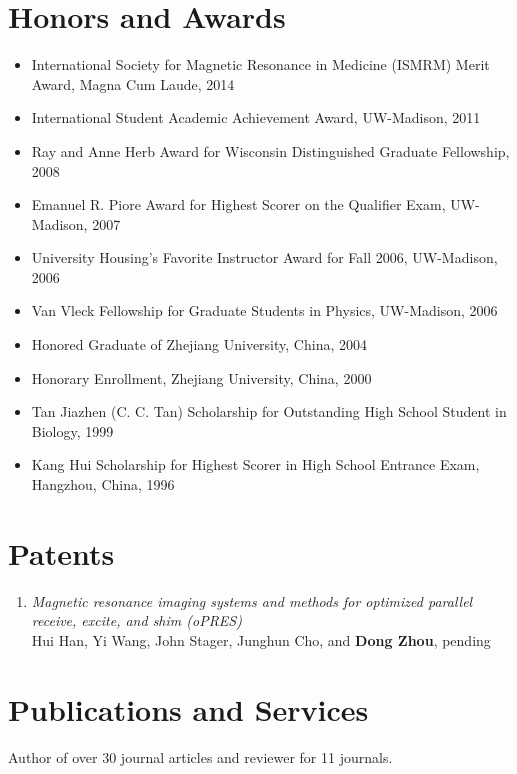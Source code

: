 \documentclass[centered,11pt,overlapped]{res}
\begin{document}
\begin{resume}
{\section{\sc Honors and Awards}
\begin{itemize}[leftmargin=-0.1in]
\item International Society for Magnetic Resonance in Medicine (ISMRM) Merit Award, Magna Cum Laude, 2014
\item International Student Academic Achievement Award, UW-Madison, 2011
\item Ray and Anne Herb Award for Wisconsin Distinguished Graduate Fellowship, 2008
\item Emanuel R. Piore Award for Highest Scorer on the Qualifier Exam, UW-Madison, 2007
\item University Housing's Favorite Instructor Award for Fall 2006, UW-Madison, 2006
\item Van Vleck Fellowship for Graduate Students in Physics, UW-Madison, 2006
\item Honored Graduate of Zhejiang University, China, 2004
\item Honorary Enrollment, Zhejiang University, China, 2000
\item Tan Jiazhen (C. C. Tan) Scholarship for Outstanding High School Student in Biology, 1999
\item Kang Hui Scholarship for Highest Scorer in High School Entrance Exam, Hangzhou, China, 1996
\end{itemize}

\section{\sc Patents}
\begin{enumerate}[leftmargin=-0.1in]
\item {\em Magnetic resonance imaging systems and methods for optimized parallel receive, excite, and shim (oPRES) } \\
Hui Han, Yi Wang, John Stager, Junghun Cho, and {\bf Dong Zhou}, pending
\end{enumerate}


\section{\sc Publications and Services}
Author of over 30 journal articles and reviewer for 11 journals.
}


\end{resume}
\end{document}
